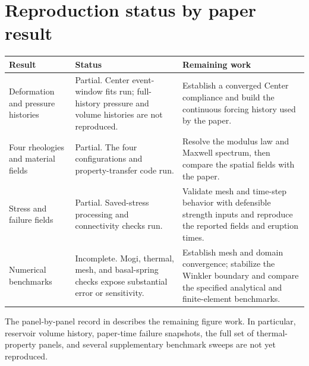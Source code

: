 \documentclass[10pt]{article}
\newcommand{\p}[1]{\path{#1}}
\begin{document}
\section*{Reproduction status by paper result}
\begin{tabularx}{\textwidth}{@{}p{}p{}X@{}}
\toprule
Result & Status & Remaining work \\
\midrule
Deformation and pressure histories & Partial. Center event-window fits run; full-history pressure and volume histories are not reproduced. & Establish a converged Center compliance and build the continuous forcing history used by the paper. \\
Four rheologies and material fields & Partial. The four configurations and property-transfer code run. & Resolve the modulus law and Maxwell spectrum, then compare the spatial fields with the paper. \\
Stress and failure fields & Partial. Saved-stress processing and connectivity checks run. & Validate mesh and time-step behavior with defensible strength inputs and reproduce the reported fields and eruption times. \\
Numerical benchmarks & Incomplete. Mogi, thermal, mesh, and basal-spring checks expose substantial error or sensitivity. & Establish mesh and domain convergence; stabilize the Winkler boundary and compare the specified analytical and finite-element benchmarks. \\
\bottomrule
\end{tabularx}

The panel-by-panel record in \p{docs/figure_reproduction.md} describes the
remaining figure work. In particular, reservoir volume history, paper-time
failure snapshots, the full set of thermal-property panels, and several
supplementary benchmark sweeps are not yet reproduced.
\end{document}
